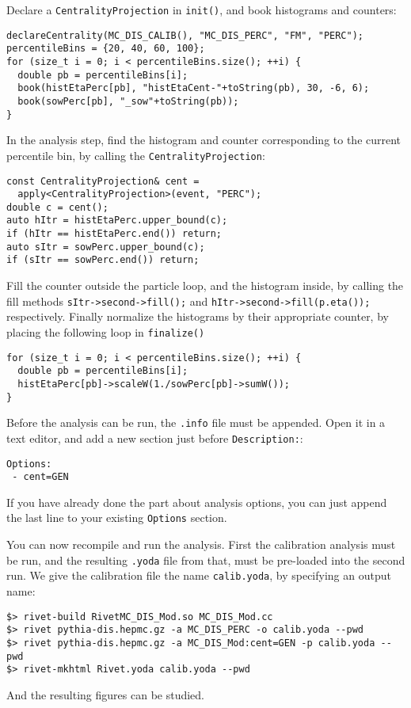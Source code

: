 \documentclass[11pt]{article}
\begin{document}
Declare a \texttt{CentralityProjection} in \texttt{init()}, and book histograms and counters:

\begin{verbatim}
declareCentrality(MC_DIS_CALIB(), "MC_DIS_PERC", "FM", "PERC");
percentileBins = {20, 40, 60, 100};
for (size_t i = 0; i < percentileBins.size(); ++i) {
  double pb = percentileBins[i];
  book(histEtaPerc[pb], "histEtaCent-"+toString(pb), 30, -6, 6);
  book(sowPerc[pb], "_sow"+toString(pb));
}
\end{verbatim}

In the analysis step, find the histogram and counter corresponding to the current percentile bin, by calling the \texttt{CentralityProjection}:

\begin{verbatim}
const CentralityProjection& cent = 
  apply<CentralityProjection>(event, "PERC");
double c = cent();
auto hItr = histEtaPerc.upper_bound(c);
if (hItr == histEtaPerc.end()) return;
auto sItr = sowPerc.upper_bound(c);
if (sItr == sowPerc.end()) return;
\end{verbatim}
Fill the counter outside the particle loop, and the histogram inside, by calling the fill methods \texttt{sItr->second->fill();} and \texttt{hItr->second->fill(p.eta());} respectively. Finally normalize the histograms by their appropriate counter, by placing the following loop in \texttt{finalize()}

\begin{verbatim}
for (size_t i = 0; i < percentileBins.size(); ++i) {
  double pb = percentileBins[i];
  histEtaPerc[pb]->scaleW(1./sowPerc[pb]->sumW());
}
\end{verbatim}
Before the analysis can be run, the \texttt{.info} file must be appended. Open it in a text editor, and add a new section just before \texttt{Description:}:
\begin{verbatim}
Options:
 - cent=GEN
\end{verbatim}
If you have already done the part about analysis options, you can just append the last line to your existing \texttt{Options} section.

You can now recompile and run the analysis. First the calibration analysis must be run, and the resulting \texttt{.yoda} file from that, must be pre-loaded into the second run. We give the calibration file the name \texttt{calib.yoda}, by specifying an output name:

\begin{verbatim}
$> rivet-build RivetMC_DIS_Mod.so MC_DIS_Mod.cc
$> rivet pythia-dis.hepmc.gz -a MC_DIS_PERC -o calib.yoda --pwd
$> rivet pythia-dis.hepmc.gz -a MC_DIS_Mod:cent=GEN -p calib.yoda --pwd
$> rivet-mkhtml Rivet.yoda calib.yoda --pwd
\end{verbatim}
And the resulting figures can be studied.
\end{document}
